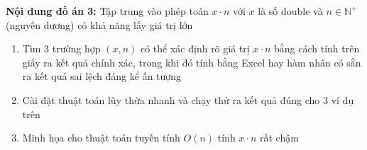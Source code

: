 \LARGE\textbf{Nội dung đồ án 3: }
Tập trung vào phép toán $x \cdot n$ với $x$ là số double và $n \in \mathbb{N}^{+}$ (nguyên dương) có khả năng lấy giá trị lớn

\renewcommand{\labelenumi}{\alph{enumi})}
\begin{enumerate}
    \item Tìm 3 trường hợp $(x,n)$ có thể xác định rõ giá trị $x \cdot n$ bằng cách tính trên giấy ra kết quả chính xác, trong khi đó tính bằng Excel hay hàm nhân có sẵn ra kết quả sai lệch đáng kể ấn tượng
    
    \item Cài đặt thuật toán lũy thừa nhanh và chạy thử ra kết quả đúng cho 3 ví dụ trên
    
    \item Minh họa cho thuật toán tuyến tính $O(n)$ tính $x \cdot n$ rất chậm
    
\end{enumerate}